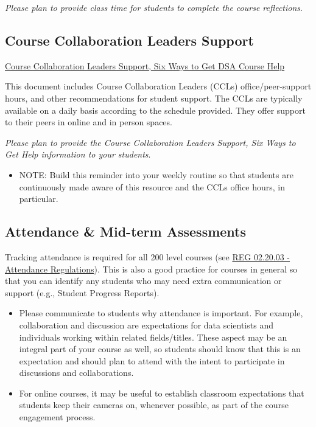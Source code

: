 \documentclass[
]{book}
\providecommand{\tightlist}{%
  \setlength{\itemsep}{0pt}\setlength{\parskip}{0pt}}
\begin{document}
{ \emph{Please plan to provide class time for students to complete the course reflections}. }

\hypertarget{course-collaboration-leaders-support}{%
\subsection{Course Collaboration Leaders Support}\label{course-collaboration-leaders-support}}

\href{https://docs.google.com/document/d/1VBU50OeG9g47yYYhizHAyhNDhDBl87RlhLuQHXn8BZ0/edit?usp=sharing}{Course Collaboration Leaders Support, Six Ways to Get DSA Course Help}

This document includes Course Collaboration Leaders (CCLs) office/peer-support hours, and other recommendations for student support. The CCLs are typically available on a daily basis according to the schedule provided. They offer support to their peers in online and in person spaces.

{ \emph{Please plan to provide the Course Collaboration Leaders Support, Six Ways to Get Help information to your students}. }

\begin{itemize}
\tightlist
\item
  NOTE: Build this reminder into your weekly routine so that students are continuously made aware of this resource and the CCLs office hours, in particular.
\end{itemize}

\hypertarget{attendance-mid-term-assessments}{%
\subsection{Attendance \& Mid-term Assessments}\label{attendance-mid-term-assessments}}

Tracking attendance is required for all 200 level courses (see \href{https://policies.ncsu.edu/regulation/reg-02-20-03-attendance-regulations/}{REG 02.20.03 - Attendance Regulations}). This is also a good practice for courses in general so that you can identify any students who may need extra communication or support (e.g., Student Progress Reports).

\begin{itemize}
\item
  Please communicate to students why attendance is important. For example, collaboration and discussion are expectations for data scientists and individuals working within related fields/titles. These aspect may be an integral part of your course as well, so students should know that this is an expectation and should plan to attend with the intent to participate in discussions and collaborations.
\item
  For online courses, it may be useful to establish classroom expectations that students keep their cameras on, whenever possible, as part of the course engagement process.
\end{itemize}
\end{document}
